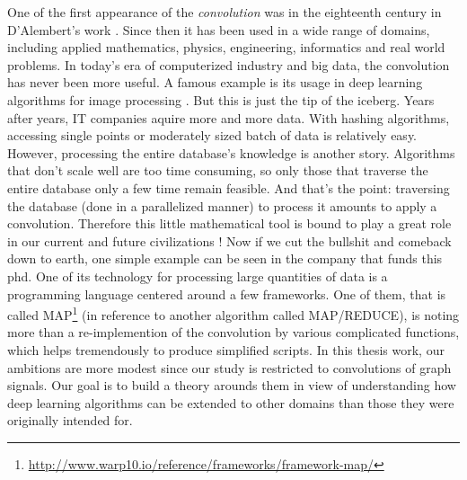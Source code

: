 

One of the first appearance of the \emph{convolution} was in the eighteenth century in D'Alembert's work \citep{wiki:enc}. Since then it has been used in a wide range of domains, including applied mathematics, physics, engineering, informatics and real world problems. In today's era of computerized industry and big data, the convolution has never been more useful. A famous example is its usage in deep learning algorithms for image processing \citep{lecun2015deep}. But this is just the tip of the iceberg. Years after years, IT companies aquire more and more data. With hashing algorithms, accessing single points or moderately sized batch of data is relatively easy. However, processing the entire database's knowledge is another story. Algorithms that don't scale well are too time consuming, so only those that traverse the entire database only a few time remain feasible. And that's the point: traversing the database (done in a parallelized manner) to process it amounts to apply a convolution. Therefore this little mathematical tool is bound to play a great role in our current and future civilizations ! Now if we cut the bullshit and comeback down to earth, one simple example can be seen in the company that funds this phd. One of its technology for processing large quantities of data is a programming language centered around a few frameworks. One of them, that is called MAP\footnote{\url{http://www.warp10.io/reference/frameworks/framework-map/}} (in reference to another algorithm called MAP/REDUCE), is noting more than a re-implemention of the convolution by various complicated functions, which helps tremendously to produce simplified scripts. In this thesis work, our ambitions are more modest since our study is restricted to convolutions of graph signals. Our goal is to build a theory arounds them in view of understanding how deep learning algorithms can be extended to other domains than those they were originally intended for.

